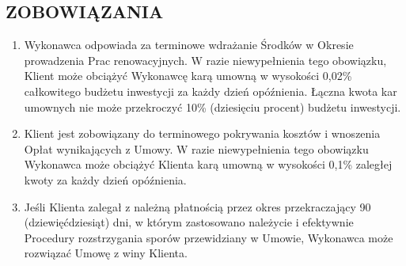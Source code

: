 \begin{multicols}{2}
\subsection{ZOBOWIĄZANIA}
\begin{enumerate}
	\item Wykonawca odpowiada za terminowe wdrażanie Środków w Okresie prowadzenia Prac renowacyjnych. W razie niewypełnienia tego obowiązku, Klient może obciążyć Wykonawcę karą umowną w wysokości 0,02\% całkowitego budżetu inwestycji za każdy dzień opóźnienia. Łączna kwota kar umownych nie może przekroczyć 10\% (dziesięciu procent) budżetu inwestycji.
	\item Klient jest zobowiązany do terminowego pokrywania kosztów i wnoszenia Opłat wynikających z Umowy. W razie niewypełnienia tego obowiązku Wykonawca może obciążyć Klienta karą umowną w wysokości 0,1\% zaległej kwoty za każdy dzień opóźnienia.
	\item Jeśli Klienta zalegał z należną płatnością przez okres przekraczający 90 (dziewięćdziesiąt) dni, w którym zastosowano należycie i efektywnie Procedury rozstrzygania sporów przewidziany w Umowie, Wykonawca może rozwiązać Umowę z winy Klienta.


\end{enumerate}
\end{multicols}
